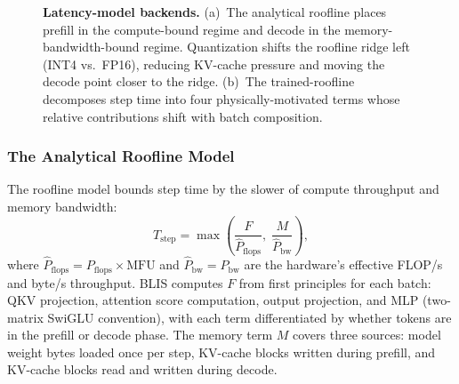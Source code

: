 \documentclass[11pt]{article}
\theoremstyle{plain} %
\theoremstyle{definition} %
\theoremstyle{remark} %
\numberwithin{equation}{section}
\begin{document}
\begin{figure}[t]
\caption{\textbf{Latency-model backends.}
  (a)~The analytical roofline places prefill in the compute-bound regime
  and decode in the memory-bandwidth-bound regime.
  Quantization shifts the roofline ridge left (INT4 vs.\ FP16), reducing KV-cache
  pressure and moving the decode point closer to the ridge.
  (b)~The trained-roofline decomposes step time into four physically-motivated terms
  whose relative contributions shift with batch composition.}
\label{fig:latency-model}
\end{figure}

\subsubsection{The Analytical Roofline Model}
\label{subsubsec:roofline}

The roofline model bounds step time by the slower of compute throughput and memory
bandwidth:
\begin{equation}
  T_\text{step} = \max\!\left(\frac{F}{\hat{P}_\text{flops}},\;\frac{M}{\hat{P}_\text{bw}}\right),
  \label{eq:roofline}
\end{equation}
where $\hat{P}_\text{flops} = P_\text{flops} \times \mathrm{MFU}$ and
$\hat{P}_\text{bw} = P_\text{bw}$ are the hardware's effective FLOP/s and byte/s
throughput.
BLIS computes $F$ from first principles for each batch: QKV projection, attention
score computation, output projection, and MLP (two-matrix SwiGLU convention),
with each term differentiated by whether tokens are in the prefill or decode phase.
The memory term $M$ covers three sources: model weight bytes loaded once per step,
KV-cache blocks written during prefill, and KV-cache blocks read and written during
decode.
\end{document}

